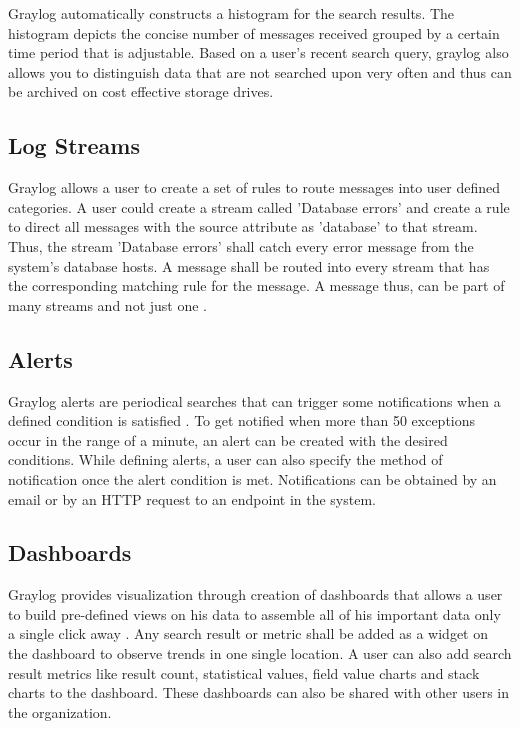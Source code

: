 \documentclass[9pt,twocolumn,twoside]{../../styles/osajnl}
\begin{document}
Graylog automatically constructs a histogram for the search
results. The histogram depicts the concise number of messages received
grouped by a certain time period that is adjustable.  Based on a user’s
recent search query, graylog also allows you to distinguish data that
are not searched upon very often and thus can be archived on cost
effective storage drives.

\subsection{Log Streams}

Graylog allows a user to create a set of rules to route messages into
user defined categories. A user could create a stream called 'Database
errors' and create a rule to direct all messages with the source
attribute as 'database' to that stream. Thus, the stream 'Database
errors' shall catch every error message from the system's database
hosts. A message shall be routed into every stream that has the
corresponding matching rule for the message. A message thus, can be
part of many streams and not just one \cite{www-graylog-streams}.

\subsection{Alerts}

Graylog alerts are periodical searches that can trigger some
notifications when a defined condition is satisfied
\cite{www-graylog-alerts}. To get notified when more than 50
exceptions occur in the range of a minute, an alert can be created
with the desired conditions.  While defining alerts, a user can also
specify the method of notification once the alert condition is
met. Notifications can be obtained by an email or by an HTTP request
to an endpoint in the system.

\subsection{Dashboards}

Graylog provides visualization through creation of dashboards that
allows a user to build pre-defined views on his data to assemble all
of his important data only a single click away
\cite{www-graylog-dashboards}. Any search result or metric shall be
added as a widget on the dashboard to observe trends in one single
location.  A user can also add search result metrics like result
count, statistical values, field value charts and stack charts to the
dashboard. These dashboards can also be shared with other users in the
organization.
\end{document}

